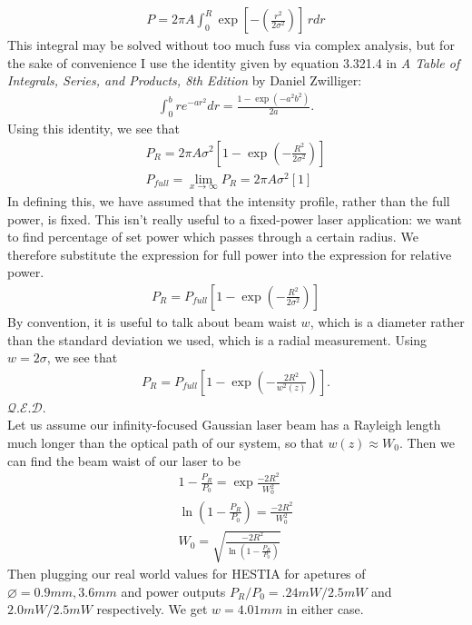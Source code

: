 \begin{gather}
       P = 2\pi A \int^{R}_{0} \exp \left[-\left(\frac{r^2}{2\sigma^2}\right)\right] \, r dr
\end{gather}
This integral may be solved without too much fuss via complex analysis, but for the sake of convenience I use the identity given by equation 3.321.4 in \textit{A Table of Integrals, Series, and Products, 8th Edition} by Daniel Zwilliger:
\begin{gather}
    \int^b_0 r e^{-ar^2} dr = \frac{1-\exp\left(-a^2b^2\right)}{2a}.
\end{gather}
Using this identity, we see that
\begin{gather}
    P_R = 2\pi A \sigma^2 \left[ 1-\exp(-\frac{R^2}{2\sigma^2})\right]\\
    P_{full} = \lim_{x\to\infty} P_R  = 2\pi A \sigma^2 [1]
\end{gather}
In defining this, we have assumed that the intensity profile, rather than the full power, is fixed. This isn't really useful to a fixed-power laser application: we want to find percentage of set power which passes through a certain radius. We therefore substitute the expression for full power into the expression for relative power.
\begin{gather}
     P_R = P_{full} \left[ 1-\exp\left(-\frac{R^2}{2\sigma^2}\right)\right]
\end{gather}
By convention, it is useful to talk about beam waist $w$, which is a diameter rather than the standard deviation we used, which is a radial measurement. Using $w=2\sigma$, we see that
\begin{gather}
    P_R = P_{full} \left[ 1-\exp\left(-\frac{2R^2}{w^2(z)}\right)\right].
\end{gather}
$\mathcal{Q}.\mathcal{E}.\mathcal{D}.$\\
Let us assume our infinity-focused Gaussian laser beam has a Rayleigh length much longer than the optical path of our system, so that $w(z)\approx W_0$. Then we can find the beam waist of our laser to be
\begin{gather}
    1-\frac{P_R}{P_0} = \exp{\frac{-2R^2}{W_0^2}}\\
    \ln{\left( 1-\frac{P_R}{P_0}\right)}=\frac{-2R^2}{W_0^2}\\
    W_0 = \sqrt{\frac{-2R^2}{\ln{\left( 1-\frac{P_R}{P_0}\right)}}}
\end{gather}
Then plugging our real world values for HESTIA for apetures of $\diameter = 0.9mm, 3.6mm$ and power outputs $P_R/P_0 =  .24mW/2.5mW$ and $2.0mW/2.5mW$ respectively. We get $w=4.01mm$ in either case.
